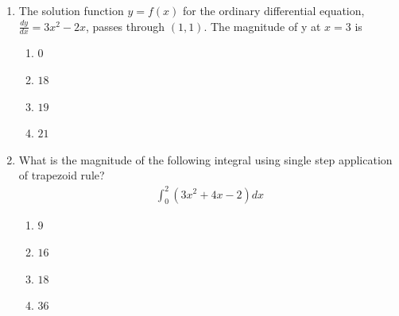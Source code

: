 \documentclass[journal]{IEEEtran}
\theoremstyle{remark}
\begin{document}
\begin{enumerate}
\item The solution function $y=f(x)$ for the ordinary differential equation, $\frac{dy}{dx} = 3x^2 - 2x$, passes through $(1,1)$. The magnitude of y at $x=3 $ is
\hfill{}
\begin{multicols}{4}
\begin{enumerate}
\item $0$
\item $18$
\item $19$
\item $21$
\end{enumerate}
\end{multicols}

\item What is the magnitude of the following integral using single step application of trapezoid rule?\hfill{}
\begin{align}
 \int_0^2(3x^2 + 4x  -2)dx
\end{align}
\begin{multicols}{4}
\begin{enumerate}
\item $9$
\item $16$
\item $18$
\item $36$
\end{enumerate}
\end{multicols}


\end{enumerate}
\end{document}
